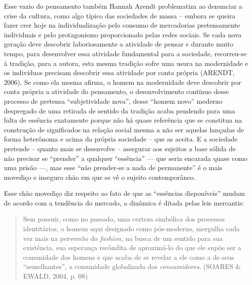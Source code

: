 Esse vazio do pensamento também Hannah Arendt problematiza ao denunciar
a crise da cultura, como algo típico das sociedades de massa -- embora
se queira fazer crer hoje na individualização pelo consumo de
mercadorias pretensamente individuais e pelo protagonismo proporcionado
pelas redes sociais. Se cada nova geração deve descobrir laboriosamente
a atividade de pensar e durante muito tempo, para desenvolver essa
atividade fundamental para a sociedade, recorreu-se à tradição, para a
autora, esta mesma tradição sofre uma usura na modernidade e os
indivíduos precisam descobrir essa atividade por conta própria (ARENDT,
2006). Se como ela mesma afirma, o homem na modernidade deve descobrir
por conta própria a atividade do pensamento, o desenvolvimento contínuo
desse processo de pretensa ``subjetividade nova'', desse ``homem novo''
moderno despregado de uma retirada de sentido da tradição acaba pendendo
para uma falta de essência exatamente porque não há quase referência que
se constitua na construção de significados na relação social mesma a não
ser aquelas lançadas de forma heterônoma e acima da própria sociedade --
que as aceita. E a sociedade pretende -- quanto mais se desenvolve --
assegurar aos sujeitos a base sólida de não precisar se ``prender'' a
qualquer ``essência'' --- que seria encarada quase como uma prisão ---,
mas esse ``não prender-se a nada de permanente'' é o mais movediço e
inseguro chão em que se vê o sujeito contemporâneo.

Esse chão movediço diz respeito ao fato de que as ``essências
disponíveis'' mudam de acordo com a tendência do mercado, a dinâmica é
ditada pelas leis mercantis:

\begin{quote}
Sem possuir, como no passado, uma certeza simbólica dos processos
identitários, o homem aqui designado como pós-moderno, mergulha cada vez
mais na perversão do \emph{fashion}, na busca de um sentido para sua
existência, sua esperança recôndita de aproximá-lo do que ele supõe ser
a comunidade dos homens e que acaba de se revelar a ele como a de seus
``semelhantes'', a comunidade globalizada dos \emph{consumidores}.
(SOARES \& EWALD, 2004, p. 08)
\end{quote}

